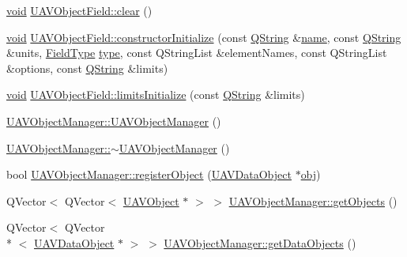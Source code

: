 \begin{DoxyCompactItemize}
\item 
\hyperlink{group___u_a_v_objects_plugin_ga444cf2ff3f0ecbe028adce838d373f5c}{void} \hyperlink{group___u_a_v_objects_plugin_ga3d25ad42d17576d9c6218bd1c65345a9}{U\-A\-V\-Object\-Field\-::clear} ()
\item 
\hyperlink{group___u_a_v_objects_plugin_ga444cf2ff3f0ecbe028adce838d373f5c}{void} \hyperlink{group___u_a_v_objects_plugin_ga8c808af230791ca079eca575c6c6c1ae}{U\-A\-V\-Object\-Field\-::constructor\-Initialize} (const \hyperlink{group___u_a_v_objects_plugin_gab9d252f49c333c94a72f97ce3105a32d}{Q\-String} \&\hyperlink{glext_8h_ad977737dfc9a274a62741b9500c49a32}{name}, const \hyperlink{group___u_a_v_objects_plugin_gab9d252f49c333c94a72f97ce3105a32d}{Q\-String} \&units, \hyperlink{uavobjectparser_8h_aa01498a3ceb2fa74dc9536c16caef1da}{Field\-Type} \hyperlink{glext_8h_a7d05960f4f1c1b11f3177dc963a45d86}{type}, const Q\-String\-List \&element\-Names, const Q\-String\-List \&options, const \hyperlink{group___u_a_v_objects_plugin_gab9d252f49c333c94a72f97ce3105a32d}{Q\-String} \&limits)
\item 
\hyperlink{group___u_a_v_objects_plugin_ga444cf2ff3f0ecbe028adce838d373f5c}{void} \hyperlink{group___u_a_v_objects_plugin_ga7ceda7a3dfdcca81d80ed887485c4b76}{U\-A\-V\-Object\-Field\-::limits\-Initialize} (const \hyperlink{group___u_a_v_objects_plugin_gab9d252f49c333c94a72f97ce3105a32d}{Q\-String} \&limits)
\item 
\hyperlink{group___u_a_v_objects_plugin_ga407e523ca4304b00cc600c49f110e60a}{U\-A\-V\-Object\-Manager\-::\-U\-A\-V\-Object\-Manager} ()
\item 
\hyperlink{group___u_a_v_objects_plugin_ga0b1af95f366fc372f94307f59513933d}{U\-A\-V\-Object\-Manager\-::$\sim$\-U\-A\-V\-Object\-Manager} ()
\item 
bool \hyperlink{group___u_a_v_objects_plugin_gad71bd0967de227335d5fec0b599a54e3}{U\-A\-V\-Object\-Manager\-::register\-Object} (\hyperlink{class_u_a_v_data_object}{U\-A\-V\-Data\-Object} $\ast$\hyperlink{glext_8h_a0c0d4701a6c89f4f7f0640715d27ab26}{obj})
\item 
Q\-Vector$<$ Q\-Vector$<$ \hyperlink{class_u_a_v_object}{U\-A\-V\-Object} $\ast$ $>$ $>$ \hyperlink{group___u_a_v_objects_plugin_ga90cc8567b44fd696df9fffa8a3f24f0c}{U\-A\-V\-Object\-Manager\-::get\-Objects} ()
\item 
Q\-Vector$<$ Q\-Vector\\*
$<$ \hyperlink{class_u_a_v_data_object}{U\-A\-V\-Data\-Object} $\ast$ $>$ $>$ \hyperlink{group___u_a_v_objects_plugin_gaddd03a2027eb1ac4f3208d3fda7e76c9}{U\-A\-V\-Object\-Manager\-::get\-Data\-Objects} ()

\end{DoxyCompactItemize}
